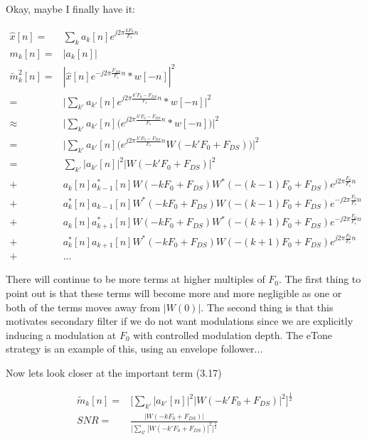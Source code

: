 \documentclass [11pt, proquest] {uwthesis}[2015/03/03]
\begin{document}
Okay, maybe I finally have it:


\begin{align}
\widehat{x}[n] =& \sum_k a_k[n] e^{j2\pi \frac{kF_0}{F_s} n} \\
m_k[n] =& | a_k[n]| \\
\tilde{m}_k^2[n] =&  | \widehat{x}[n] e^{-j2\pi \frac{F_{DS}}{F_s} n} * w[-n] |^2 \nonumber \\
=& \Big| \sum_{k'} a_{k'}[n] e^{j2\pi \frac{k'F_0 - F_{DS}}{F_s} n}* w[-n] \Big|^2 \nonumber \\
\approx& \Big| \sum_{k'} a_{k'}[n] \Big( e^{j2\pi \frac{k'F_0 - F_{DS}}{F_s} n}* w[-n] \Big) \Big|^2 \nonumber \\
=& \Big| \sum_{k'} a_{k'}[n] \Big( e^{j2\pi \frac{k'F_0 - F_{DS}}{F_s} n} W(-k'F_0 + F_{DS}) \Big) \Big|^2 \nonumber \\
=& \sum_{k'} | a_{k'}[n]|^2 |W(-k'F_0 + F_{DS})|^2 \\
+& a_k[n]a_{k-1}^*[n]W(-kF_0 + F_{DS})W^*(-(k-1)F_0 + F_{DS}) e^{j2\pi \frac{F_0}{F_s} n} \nonumber \\
+& a_k^*[n]a_{k-1}[n]W^*(-kF_0 + F_{DS})W(-(k-1)F_0 + F_{DS}) e^{-j2\pi \frac{F_0}{F_s} n}\nonumber \\
+& a_k[n]a_{k+1}^*[n]W(-kF_0 + F_{DS})W^*(-(k+1)F_0 + F_{DS})e^{-j2\pi \frac{F_0}{F_s} n} \nonumber \\
+& a_k^*[n]a_{k+1}[n]W^*(-kF_0 + F_{DS})W(-(k+1)F_0 + F_{DS})e^{j2\pi \frac{F_0}{F_s} n} \nonumber \\
+& ...
\end{align}

There will continue to be more terms at higher multiples of $F_0$.  The first thing to point out is that these terms will become more and more negligible as one or both of the terms moves away from $|W(0)|$.  The second thing is that this motivates secondary filter if we do not want modulations since we are explicitly inducing a modulation at $F_0$ with controlled modulation depth.  The eTone strategy is an example of this, using an envelope follower...

Now lets look closer at the important term (3.17)

\begin{align}
\tilde{m}_k[n] =& \Bigg[ \sum_{k'} | a_{k'}[n]|^2 |W(-k'F_0 + F_{DS})|^2 \Bigg]^\frac{1}{2} \\
SNR =& \frac{|W(-kF_0 + F_{DS})|}{\Big[ \sum_{k'} |W(-k'F_0 + F_{DS})|^2 \Big]^\frac{1}{2}}
\end{align}
\end{document}
